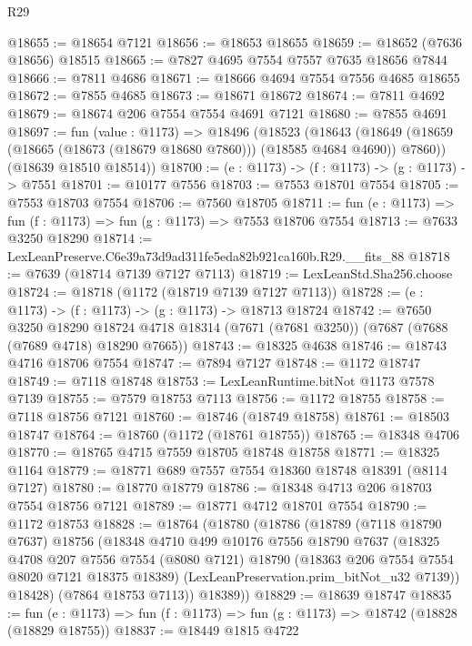 \begin{lexlean}{R29}
\begin{coremodule}
@18655 := @18654 @7121
@18656 := @18653 @18655
@18659 := @18652 (@7636 @18656) @18515
@18665 := @7827 @4695 @7554 @7557 @7635 @18656 @7844
@18666 := @7811 @4686
@18671 := @18666 @4694 @7554 @7556 @4685 @18655
@18672 := @7855 @4685
@18673 := @18671 @18672
@18674 := @7811 @4692
@18679 := @18674 @206 @7554 @7554 @4691 @7121
@18680 := @7855 @4691
@18697 := fun (value : @1173) =>
  @18496
    (@18523
      (@18643 (@18649 (@18659 (@18665 (@18673 (@18679 @18680 @7860))) (@18585 @4684 @4690)) @7860))
      (@18639 @18510 @18514))
@18700 := (e : @1173) -> (f : @1173) -> (g : @1173) -> @7551
@18701 := @10177 @7556
@18703 := @7553 @18701 @7554
@18705 := @7553 @18703 @7554
@18706 := @7560 @18705
@18711 := fun (e : @1173) => fun (f : @1173) => fun (g : @1173) => @7553 @18706 @7554
@18713 := @7633 @3250 @18290
@18714 := LexLeanPreserve.C6e39a73d9ad311fe5eda82b921ca160b.R29.__fits_88
@18718 := @7639 (@18714 @7139 @7127 @7113)
@18719 := LexLeanStd.Sha256.choose
@18724 := @18718 (@1172 (@18719 @7139 @7127 @7113))
@18728 := (e : @1173) -> (f : @1173) -> (g : @1173) -> @18713 @18724
@18742 := @7650
    @3250
    @18290
    @18724
    @4718
    @18314
    (@7671 (@7681 @3250))
    (@7687 (@7688 (@7689 @4718) @18290 @7665))
@18743 := @18325 @4638
@18746 := @18743 @4716 @18706 @7554
@18747 := @7894 @7127
@18748 := @1172 @18747
@18749 := @7118 @18748
@18753 := LexLeanRuntime.bitNot @1173 @7578 @7139
@18755 := @7579 @18753 @7113
@18756 := @1172 @18755
@18758 := @7118 @18756 @7121
@18760 := @18746 (@18749 @18758)
@18761 := @18503 @18747
@18764 := @18760 (@1172 (@18761 @18755))
@18765 := @18348 @4706
@18770 := @18765 @4715 @7559 @18705 @18748 @18758
@18771 := @18325 @1164
@18779 := @18771 @689 @7557 @7554 @18360 @18748 @18391 (@8114 @7127)
@18780 := @18770 @18779
@18786 := @18348 @4713 @206 @18703 @7554 @18756 @7121
@18789 := @18771 @4712 @18701 @7554
@18790 := @1172 @18753
@18828 := @18764
    (@18780
      (@18786
        (@18789
          (@7118 @18790 @7637)
          @18756
          (@18348
            @4710
            @499
            @10176
            @7556
            @18790
            @7637
            (@18325
              @4708
              @207
              @7556
              @7554
              (@8080 @7121)
              @18790
              (@18363 @206 @7554 @7554 @8020 @7121 @18375 @18389)
              (LexLeanPreservation.prim_bitNot_u32 @7139))
            @18428)
          (@7864 @18753 @7113))
        @18389))
@18829 := @18639 @18747
@18835 := fun (e : @1173) => fun (f : @1173) => fun (g : @1173) => @18742 (@18828 (@18829 @18755))
@18837 := @18449 @1815 @4722

\end{coremodule}
\end{lexlean}
